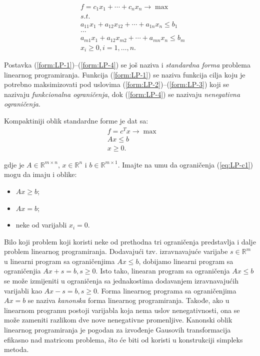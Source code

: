 \documentclass[a4paper, utf8, 11pt, colorlinks]{book}
\begin{document}
\begin{align} 
      &f = c_1 x_1 + \cdots + c_n x_n \rightarrow \max \label{form:LP-1}\\
      & s.t. \nonumber \\
      & a_{11}x_1 + a_{12} x_{12} + \cdots + a_{1n}x_n \leq b_1 \label{form:LP-2} \\
      &\ldots \nonumber \\
      & a_{m1}x_1 + a_{12} x_{m2} + \cdots + a_{mn}x_n \leq b_m \label{form:LP-3} \\
      & x_i \geq 0, i=1,\ldots,n.\label{form:LP-4}
\end{align}

Postavka (\ref{form:LP-1})--(\ref{form:LP-4}) se još naziva i \emph{standardna forma} problema linearnog programiranja. Funkcija (\ref{form:LP-1}) se naziva funkcija cilja koju je potrebno maksimizovati pod uslovima (\ref{form:LP-2})--(\ref{form:LP-3}) koji se nazivaju \emph{funkcionalna ograničenja}, dok (\ref{form:LP-4}) se nazivaju \emph{nenegativna ograničenja}. 

Kompaktiniji oblik standardne forme je dat sa:
\begin{align}
    & f = c^T x \rightarrow \max \label{eq:LP-o1}\\
    &  A x \leq b \label{eq:LP-c1} \\
    & x \geq 0 \label{eq:LP-c2}.
\end{align}

gdje je $A \in \mathbb{R}^{m \times n}$, $x \in \mathbb{R}^n$ i $b \in \mathbb{R}^{m \times 1}$. Imajte na umu da ograničenja (\ref{eq:LP-c1}) mogu da imaju i oblike:
\begin{itemize}
    \item $Ax \geq b$;
    \item $Ax = b$;
    \item neke od varijabli $x_i=0$.
\end{itemize}
Bilo koji problem koji koristi neke od prethodna tri ograničenja predstavlja i dalje problem linearnog programiranja. Dodavajući tzv. izravnavajuće varijabe $s \in \mathbb{R}^m$ u linearni program sa ograničenjima $Ax \leq b$, dobijamo linearni program sa ograničenjia $Ax + s = b, s \geq 0$. Isto tako, linearan program sa ograničenja $Ax \leq b$ se može izmijeniti u ograničenja sa jednakostima dodavanjem izravnavajućih varijabli kao $Ax - s = b, s\geq 0$. Forma linearnog programa sa ograničenjima $Ax = b$ se naziva \emph{kanonska} forma linearnog programiranja.   Takođe, ako u linearnom
programu postoji varijabla koja nema uslov nenegativnosti, ona se može zameniti razlikom dve nove nenegativne promenljive. Kanonski oblik linearnog programiranja je pogodan za izvođenje Gausovih transformacija efikasno nad matricom problema, što će biti od koristi u konstrukciji simpleks metoda.   %
\end{document}
